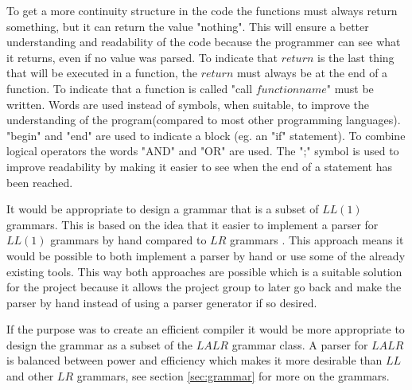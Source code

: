 To get a more continuity structure in the code the functions must always return something, but it can return the value "nothing". This will ensure a better understanding and readability of the code because the programmer can see what it returns, even if no value was parsed. To indicate that $return$ is the last thing that will be executed in a function, the $return$ must always be at the end of a function. To indicate that a function is called "call $functionname$" must be written.
Words are used instead of symbols, when suitable, to improve the understanding of the program(compared to most other programming languages).
"begin" and "end" are used to indicate a block (eg. an "if" statement). To combine logical operators the words "AND" and "OR" are used. The ";" symbol is used to improve readability by making it easier to see when the end of a statement has been reached.

It would be appropriate to design a grammar that is a subset of $LL(1)$ grammars. This is based on the idea that it easier to implement a parser for $LL(1)$ grammars by hand compared to $LR$ grammars \citep{CraftingACompiler}. This approach means it would be possible to both implement a parser by hand or use some of the already existing tools. This way both approaches are possible which is a suitable solution for the project because it allows the project group to later go back and make the parser by hand instead of using a parser generator if so desired.

If the purpose was to create an efficient compiler it would be more appropriate to design the grammar as a subset of the $LALR$ grammar class. A parser for $LALR$ is balanced between power and efficiency which makes it more desirable than $LL$ and other $LR$ grammars, see section \ref{sec:grammar} for more on the grammars. %
